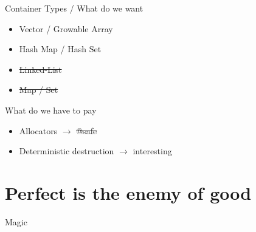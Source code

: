 \documentclass[aspectratio=169,notes]{beamer}
\begin{document}
	\begin{frame}[fragile]{Container Types / What do we want}
		\begin{itemize}
			\item Vector / Growable Array
			\item Hash Map / Hash Set\\[1cm]
			\pause
			\item \st{Linked-List}
			\pause
			\item \st{Map / Set}
		\end{itemize}
	\end{frame}

	\begin{frame}[fragile]{What do we have to pay}
		\begin{itemize}
			\item Allocators $\rightarrow$ \st{@safe}
			\item Deterministic destruction $\rightarrow$ interesting
		\end{itemize}
	\end{frame}

	\section{Perfect is the enemy of good}
	\begin{frame}[fragile]{Magic}
		\begin{columns}[T]
		\begin{column}{0.52\textwidth}
		
		\end{column}
		\begin{column}{0.48\textwidth}
		\end{column}
		\end{columns}
	\end{frame}
	
\end{document}
